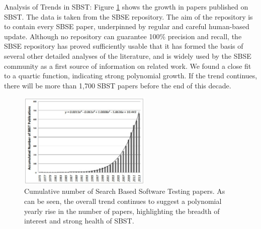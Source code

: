 \documentclass[conference]{IEEEtran}
\begin{document}
Analysis of Trends in SBST: Figure \ref{fig-increaseInSBST} shows the growth in
papers published on SBST. The data is taken from the SBSE
repository. The aim of the repository is to contain every
SBSE paper, underpinned by regular and careful human-based
update. Although no repository can guarantee 100\% precision
and recall, the SBSE repository has proved sufficiently usable
that it has formed the basis of several other detailed analyses
of the literature, and is widely used by the SBSE
community as a first source of information on related work.
We found a close fit to a quartic function, indicating strong
polynomial growth. If the trend continues, there will be more
than 1,700 SBST papers before the end of this decade.

\begin{figure}[!t]
  \centering
  \includegraphics[width=2.5in]{strongHealthOfSBST.jpg}
  \caption{Cumulative number of Search Based Software Testing
  papers. As can be seen, the overall trend continues to suggest
  a polynomial yearly rise in the number of papers, highlighting
  the breadth of interest and strong health of SBST.} 
  \label{fig-increaseInSBST}
\end{figure}










\end{document}
